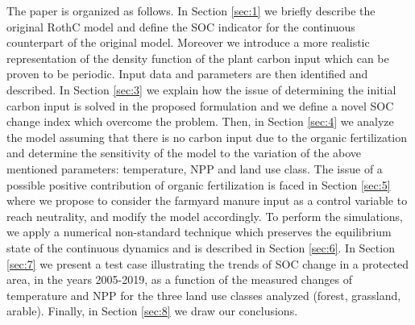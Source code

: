 \noindent The paper is organized as follows. In Section \ref{sec:1} we briefly describe the original RothC model and define the SOC indicator for the continuous counterpart of the original model. Moreover  we introduce a more realistic representation of the density function of the plant carbon input which can be proven to be periodic. Input data and parameters are then identified and described. In Section \ref{sec:3} we explain how the issue of determining the initial carbon input  is solved in the proposed formulation and we define a novel SOC change index which  overcome the problem. Then, in Section \ref{sec:4} we analyze the model assuming that there is no carbon input due to the organic fertilization and determine  the sensitivity of the model to the variation of the above mentioned  parameters:  temperature, NPP and land use class. The issue of a possible positive contribution of organic fertilization is faced in Section \ref{sec:5} where we propose to consider the farmyard manure input as a control variable to reach neutrality, and modify the model accordingly. To perform the simulations, we apply  a numerical non-standard technique which preserves the equilibrium state of the continuous dynamics and is  described in Section \ref{sec:6}. In Section \ref{sec:7} we present a test case illustrating the trends of SOC change in a protected area,  in the years 2005-2019, as a function of the measured changes of temperature and NPP for the three land use classes analyzed (forest, grassland, arable). Finally, in Section \ref{sec:8} we draw our conclusions.

